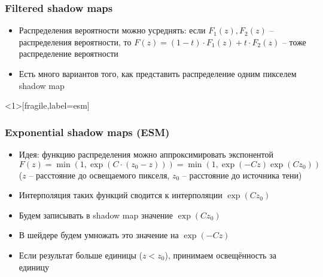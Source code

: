 \documentclass[10pt]{beamer}
\begin{document}
\begin{frame}[fragile]
\frametitle{Filtered shadow maps}
\begin{itemize}
\item Распределения вероятности можно усреднять: если \begin{math}F_1(z), F_2(z)\end{math} -- распределения вероятности, то \begin{math}F(z) = (1 - t) \cdot F_1(z) + t \cdot F_2(z)\end{math} -- тоже распределение вероятности
\pause
\item Есть много вариантов того, как представить распределение одним пикселем shadow map
\end{itemize}
\end{frame}

\begin{frame}<1>[fragile,label=esm]
\frametitle{Exponential shadow maps (ESM)}
\begin{itemize}
\item Идея: функцию распределения можно аппроксимировать экспонентой \begin{math}F(z) = \min(1, \exp(C \cdot (z_0 - z))) = \min(1, \exp(-Cz)\exp(Cz_0))\end{math} (\begin{math}z\end{math} -- расстояние до освещаемого пикселя, \begin{math}z_0\end{math} -- расстояние до источника тени)
\pause
\item Интерполяция таких функций сводится к интерполяции \begin{math}\exp(Cz_0)\end{math}
\pause
\item Будем записывать в shadow map значение \begin{math}\exp(Cz_0)\end{math}
\pause
\item В шейдере будем умножать это значение на \begin{math}\exp(-Cz)\end{math}
\pause
\item Если результат больше единицы (\begin{math}z < z_0\end{math}), принимаем освещённость за единицу
\end{itemize}
\end{frame}
\end{document}
